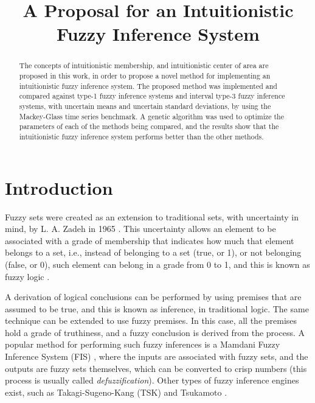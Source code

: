 \documentclass[conference]{IEEEtran}
\begin{document}
\title{A Proposal for an Intuitionistic Fuzzy Inference System}


\author{
  }

\maketitle

\begin{abstract}
The concepts of intuitionistic membership, and intuitionistic center of
area are proposed in this work, in order to propose a novel method for
implementing an intuitionistic fuzzy inference system. The proposed
method was implemented and compared against type-1 fuzzy inference
systems and interval type-3 fuzzy inference systems, with uncertain
means and uncertain standard deviations, by using the
Mackey-Glass time series benchmark. A genetic algorithm was used to
optimize the parameters of each of the methods being compared, and the
results show that the intuitionistic fuzzy inference system performs
better than the other methods.
\end{abstract}

\IEEEpeerreviewmaketitle



\section{Introduction}

Fuzzy sets were created as an extension to traditional sets, with
uncertainty in mind, by L. A. Zadeh in 1965 \cite{zadeh1965fuzzy}. This uncertainty allows an
element to be associated with a grade of membership that indicates
how much that element belongs to a set, i.e., instead of
belonging to a set (true, or 1), or not belonging (false, or 0),
such element can belong in a grade from 0 to 1, and this is known as
fuzzy logic \cite{klir1995fuzzy}.

A derivation of logical conclusions can be performed by using premises
that are assumed to be true, and this is known as inference, in
traditional logic. The same
technique can be extended to use fuzzy premises. In this case, all the
premises hold a grade of truthiness, and a fuzzy conclusion is derived
from the process. A popular method for performing such fuzzy inferences is a
Mamdani Fuzzy Inference System (FIS) \cite{mamdani1975experiment},
where the inputs are associated with fuzzy sets, and the outputs are
fuzzy sets themselves, which can be converted to crisp numbers
(this process is usually called \textit{defuzzification}). Other types of
fuzzy inference engines exist, such as Takagi-Sugeno-Kang  (TSK)
\cite{takagi1985fuzzy} and Tsukamoto \cite{tsukamoto1979approach}.
\end{document}
